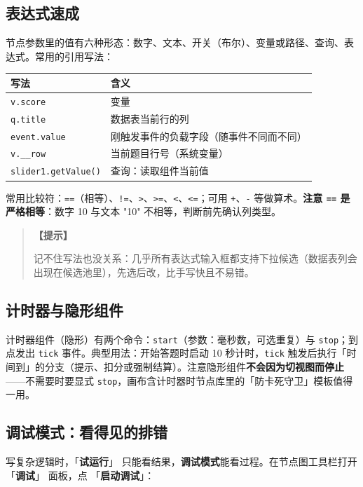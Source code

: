 \documentclass[UTF8,a4paper,zihao=-4]{ctexart}
\newcommand{\code}[1]{\texttt{#1}}   %
\newcommand{\ui}[1]{「\textbf{#1}」}  %
\newenvironment{tip}[1][提示]{%
  \begin{quote}\small\textbf{【#1】}\ignorespaces
}{\end{quote}}
\begin{document}
\subsection{表达式速成}

节点参数里的值有六种形态：数字、文本、开关（布尔）、变量或路径、查询、表达式。常用的引用写法：

\begin{center}
\begin{tabular}{ll}
\toprule
写法 & 含义 \\
\midrule
\code{v.score} & 变量 \\
\code{q.title} & 数据表当前行的列 \\
\code{event.value} & 刚触发事件的负载字段（随事件不同而不同） \\
\code{v.\_\_row} & 当前题目行号（系统变量） \\
\code{slider1.getValue()} & 查询：读取组件当前值 \\
\bottomrule
\end{tabular}
\end{center}

常用比较符：\code{==}（相等）、\code{!=}、\code{>}、\code{>=}、\code{<}、\code{<=}；可用 \code{+}、\code{-} 等做算术。\textbf{注意 \code{==} 是严格相等}：数字 10 与文本 "10" 不相等，判断前先确认列类型。

\begin{tip}
记不住写法也没关系：几乎所有表达式输入框都支持下拉候选（数据表列会出现在候选池里），先选后改，比手写快且不易错。
\end{tip}

\subsection{计时器与隐形组件}

计时器组件（隐形）有两个命令：\code{start}（参数：毫秒数，可选重复）与 \code{stop}；到点发出 \code{tick} 事件。典型用法：开始答题时启动 10 秒计时，\code{tick} 触发后执行「时间到」的分支（提示、扣分或强制结算）。注意隐形组件\textbf{不会因为切视图而停止}——不需要时要显式 \code{stop}，画布含计时器时节点库里的「防卡死守卫」模板值得一用。

\subsection{调试模式：看得见的排错}

写复杂逻辑时，\ui{试运行} 只能看结果，\textbf{调试模式}能看过程。在节点图工具栏打开 \ui{调试} 面板，点 \ui{启动调试}：
\end{document}
